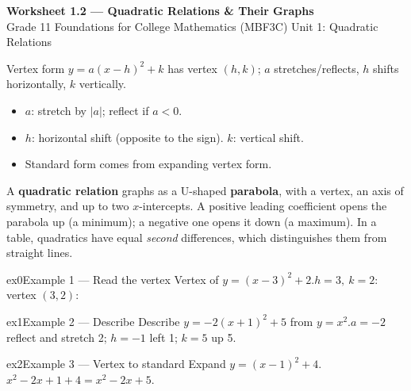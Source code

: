 \documentclass[11pt]{article}
\begin{document}
\begin{center}
{\LARGE\bfseries\color{titleblue}Worksheet 1.2 --- Quadratic Relations \& Their Graphs}\\[2pt]
{\small Grade 11 Foundations for College Mathematics (MBF3C) \textperiodcentered{} Unit 1: Quadratic Relations}
\end{center}

\begin{ideabox}
Vertex form $y=a(x-h)^2+k$ has vertex $(h,k)$; $a$ stretches/reflects, $h$ shifts horizontally, $k$ vertically.
\begin{itemize}[leftmargin=*,itemsep=2pt]
  \item $a$: stretch by $|a|$; reflect if $a<0$.
  \item $h$: horizontal shift (opposite to the sign). $k$: vertical shift.
  \item Standard form comes from expanding vertex form.
\end{itemize}
\end{ideabox}

\begin{learnbox}
A \textbf{quadratic relation} graphs as a U-shaped \textbf{parabola}, with a vertex, an axis of symmetry, and up to two $x$-intercepts.
A positive leading coefficient opens the parabola up (a minimum); a negative one opens it down (a maximum).
In a table, quadratics have equal \emph{second} differences, which distinguishes them from straight lines.
\end{learnbox}


\begin{example}{ex0}{Example 1 --- Read the vertex}
Vertex of $y=(x-3)^2+2$.\soln $h=3,\ k=2$: vertex $(3,2)$:
\end{example}

\begin{example}{ex1}{Example 2 --- Describe}
Describe $y=-2(x+1)^2+5$ from $y=x^2$.\soln $a=-2$ reflect and stretch 2; $h=-1$ left 1; $k=5$ up 5.
\end{example}

\begin{example}{ex2}{Example 3 --- Vertex to standard}
Expand $y=(x-1)^2+4$.\soln $x^2-2x+1+4=x^2-2x+5$.
\end{example}
\end{document}
